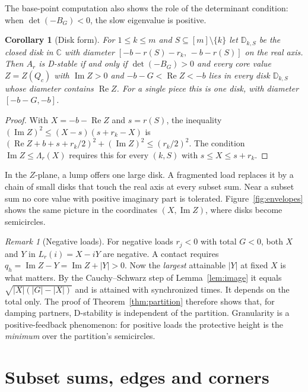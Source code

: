 \documentclass[11pt,a4paper]{article}
\theoremstyle{plain}
\newtheorem{corollary}[theorem]{Corollary}
\theoremstyle{definition}
\theoremstyle{remark}
\newtheorem{remark}[theorem]{Remark}
\newcommand{\C}{\mathbb{C}}
\newcommand{\Real}{\operatorname{Re}}
\newcommand{\Imag}{\operatorname{Im}}
\newcommand{\Env}{\Lambda}
\newcommand{\Disk}{\mathbb{D}}
\begin{document}
The base-point computation also shows the role of the determinant condition:
when $\det(-B_G)<0$, the slow eigenvalue is positive.

\begin{corollary}[Disk form]\label{cor:disk}
For $1\le k\le m$ and $S\subseteq[m]\setminus\{k\}$ let $\Disk_{k,S}$ be the
closed disk in $\C$ with diameter $[-b-r(S)-r_k,\,-b-r(S)]$ on the real axis.
Then $A_r$ is D-stable if and only if $\det(-B_G)>0$ and every core value
$Z=Z(Q_c)$ with $\Imag Z>0$ and $-b-G<\Real Z<-b$ lies in every disk
$\Disk_{k,S}$ whose diameter contains $\Real Z$. For a single piece this is one
disk, with diameter $[-b-G,-b]$.
\end{corollary}
\begin{proof}
With $X=-b-\Real Z$ and $s=r(S)$, the inequality
$(\Imag Z)^2\le(X-s)(s+r_k-X)$ is
$(\Real Z+b+s+r_k/2)^2+(\Imag Z)^2\le(r_k/2)^2$. The condition
$\Imag Z\le\Env_r(X)$ requires this for every $(k,S)$ with
$s\le X\le s+r_k$.
\end{proof}

In the $Z$-plane, a lump offers one large disk. A fragmented load replaces it
by a chain of small disks that touch the real axis at every subset sum. Near a
subset sum no core value with positive imaginary part is tolerated.
Figure~\ref{fig:envelopes} shows the same picture in the coordinates
$(X,\Imag Z)$, where disks become semicircles.

\begin{remark}[Negative loads]\label{rem:negative}
For negative loads $r_j<0$ with total $G<0$, both $X$ and $Y$ in
$L_r(i)=X-iY$ are negative. A contact requires $q_h=\Imag Z-Y=\Imag Z+|Y|>0$.
Now the \emph{largest} attainable $|Y|$ at fixed $X$ is what matters. By the
Cauchy--Schwarz step of Lemma~\ref{lem:image} it equals $\sqrt{|X|(|G|-|X|)}$
and is attained with synchronized times. It depends on the total only. The
proof of Theorem~\ref{thm:partition} therefore shows that, for damping
partners, D-stability is independent of the partition. Granularity is a
positive-feedback phenomenon: for positive loads the protective height is the
\emph{minimum} over the partition's semicircles.
\end{remark}

\section{Subset sums, edges and corners}\label{sec:subsets}
\end{document}
